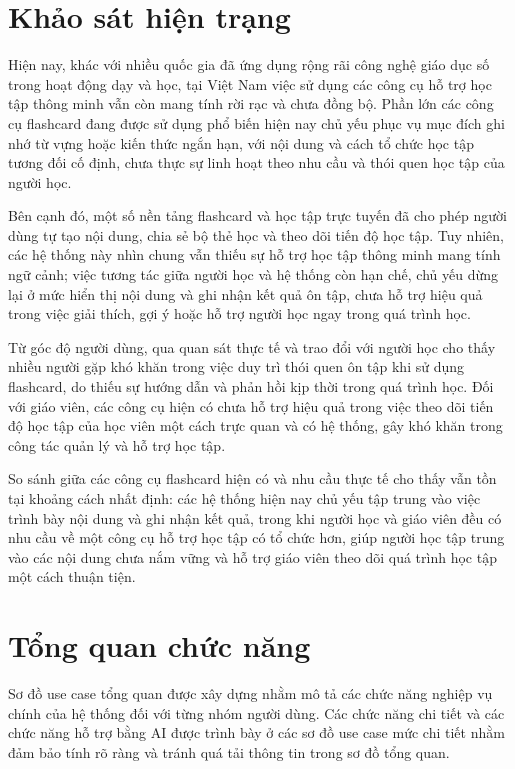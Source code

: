 \documentclass[../DoAn.tex]{subfiles}
\begin{document}
\section{Khảo sát hiện trạng}
\label{section:2.1}
Hiện nay, khác với nhiều quốc gia đã ứng dụng rộng rãi công nghệ giáo dục số trong hoạt động dạy và học, tại Việt Nam việc sử dụng các công cụ hỗ trợ học tập thông minh vẫn còn mang tính rời rạc và chưa đồng bộ. Phần lớn các công cụ flashcard đang được sử dụng phổ biến hiện nay chủ yếu phục vụ mục đích ghi nhớ từ vựng hoặc kiến thức ngắn hạn, với nội dung và cách tổ chức học tập tương đối cố định, chưa thực sự linh hoạt theo nhu cầu và thói quen học tập của người học.

Bên cạnh đó, một số nền tảng flashcard và học tập trực tuyến đã cho phép người dùng tự tạo nội dung, chia sẻ bộ thẻ học và theo dõi tiến độ học tập. Tuy nhiên, các hệ thống này nhìn chung vẫn thiếu sự hỗ trợ học tập thông minh mang tính ngữ cảnh; việc tương tác giữa người học và hệ thống còn hạn chế, chủ yếu dừng lại ở mức hiển thị nội dung và ghi nhận kết quả ôn tập, chưa hỗ trợ hiệu quả trong việc giải thích, gợi ý hoặc hỗ trợ người học ngay trong quá trình học.

Từ góc độ người dùng, qua quan sát thực tế và trao đổi với người học cho thấy nhiều người gặp khó khăn trong việc duy trì thói quen ôn tập khi sử dụng flashcard, do thiếu sự hướng dẫn và phản hồi kịp thời trong quá trình học. Đối với giáo viên, các công cụ hiện có chưa hỗ trợ hiệu quả trong việc theo dõi tiến độ học tập của học viên một cách trực quan và có hệ thống, gây khó khăn trong công tác quản lý và hỗ trợ học tập.

So sánh giữa các công cụ flashcard hiện có và nhu cầu thực tế cho thấy vẫn tồn tại khoảng cách nhất định: các hệ thống hiện nay chủ yếu tập trung vào việc trình bày nội dung và ghi nhận kết quả, trong khi người học và giáo viên đều có nhu cầu về một công cụ hỗ trợ học tập có tổ chức hơn, giúp người học tập trung vào các nội dung chưa nắm vững và hỗ trợ giáo viên theo dõi quá trình học tập một cách thuận tiện.

\section{Tổng quan chức năng}
Sơ đồ use case tổng quan được xây dựng nhằm mô tả các chức năng nghiệp vụ chính của hệ thống đối với từng nhóm người dùng. Các chức năng chi tiết và các chức năng hỗ trợ bằng AI được trình bày ở các sơ đồ use case mức chi tiết nhằm đảm bảo tính rõ ràng và tránh quá tải thông tin trong sơ đồ tổng quan.
\end{document}

